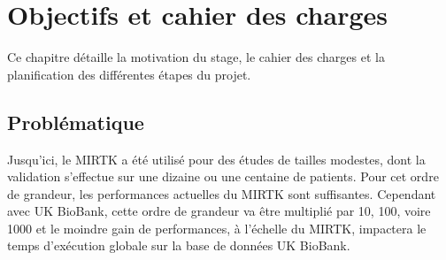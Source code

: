 \documentclass[10pt]{report}
\begin{document}
	 
	 
\chapter{Objectifs et cahier des charges}
	Ce chapitre détaille la motivation du stage, le cahier des charges et la planification des différentes étapes du projet.
	\section{Problématique} 
	Jusqu'ici, le MIRTK a été utilisé pour des études de tailles modestes, dont la validation s'effectue sur une dizaine ou une centaine de patients. Pour cet ordre de grandeur, les performances actuelles du MIRTK sont suffisantes. Cependant avec UK BioBank, cette ordre de grandeur va être multiplié par 10, 100, voire 1000 et le moindre gain de performances, à l'échelle du MIRTK, impactera le temps d'exécution globale sur la base de données UK BioBank.\\ ~\par
	
\end{document}
